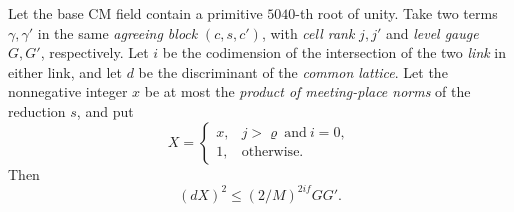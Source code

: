 \begin{lemma}
\label{lem:b-pair-discriminant-gain}
\emitthmsource
Let the base CM field contain a primitive $5040$-th root of unity. Take two terms $\gamma,\gamma'$ in the same \emph{agreeing block} $(c,s,c')$, with \emph{cell rank} $j,j'$ and \emph{level gauge} $G,G'$, respectively.
Let $i$ be the codimension of the intersection of the two \emph{link} in either link, and let $d$ be the discriminant of the \emph{common lattice}.
Let the nonnegative integer $x$ be at most the \emph{product of meeting-place norms} of the reduction $s$, and put
\[
 X=\begin{cases}
 x,& j>\varrho\ \text{and}\ i=0,\\
 1,&\text{otherwise}.
 \end{cases}
\]
Then
\[
 (dX)^2\le (2/M)^{2if}GG'.
\]
\end{lemma}
